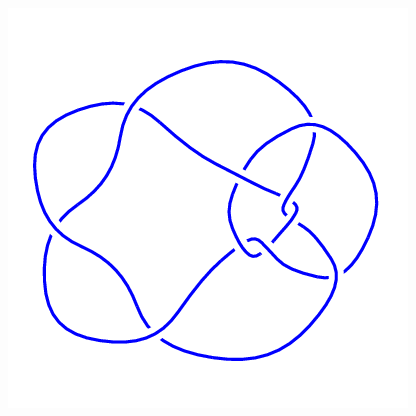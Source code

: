 \begin{figure}[H]
\begin{minipage}[b]{.18\linewidth}
	\end{minipage}
	\begin{minipage}[b]{.18\linewidth}
		\centering
		\includegraphics[width=\linewidth]{../data/10_91.png}
	\end{minipage}
\end{figure}
